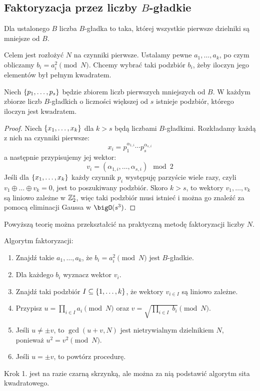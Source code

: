 \subsection{Faktoryzacja przez liczby \( B \)-gładkie}
\begin{definition}
    Dla ustalonego \( B \) liczba \( B \)-gładka to taka, której wszystkie pierwsze dzielniki są mniejsze od \( B \).
\end{definition}
    
Celem jest rozłożyć \( N \) na czynniki pierwsze. Ustalamy pewne \( a_1, \dots, a_k \), po czym obliczamy \( b_i = a_i^2 \pmod{N} \). Chcemy wybrać taki podzbiór \(b_i \), żeby iloczyn jego elementów był pełnym kwadratem.

\begin{lemma}
    Niech \( \set{p_1, \dots, p_{s}} \) będzie zbiorem liczb pierwszych mniejszych od \( B \). W każdym zbiorze liczb \( B \)-gładkich o liczności większej od \( s \) istnieje podzbiór, którego iloczyn jest kwadratem.
\end{lemma}
\begin{proof}
    Niech \( \set{x_1, \dots, x_k} \) dla \( k > s \) będą liczbami \( B \)-gładkimi. Rozkładamy każdą z nich na czynniki pierwsze:
    \[
        x_i = p_1^{\alpha_{1, i}} \cdots p_s^{\alpha_{s, i}}
    \]
    a następnie przypisujemy jej wektor:
    \[
        v_i = (\alpha_{1, i}, \dots, \alpha_{s, i}) \mod 2
    \]
    Jeśli dla \( \set{x_1, \dots, x_k} \) każdy czynnik \( p_i \) występuję parzyście wiele razy, czyli \( v_1 \oplus \ldots \oplus v_k = 0 \), jest to poszukiwany podzbiór.
    Skoro \( k > s \), to wektory \( v_1, \dots, v_k \) są liniowo zależne w \( \mathbb{Z}_2^{s} \), więc taki podzbiór musi istnieć i można go znaleźć za pomocą eliminacji Gaussa w \( \bigO(s^3) \).
\end{proof}
Powyższą teorię można przekształcić na praktyczną metodę faktoryzacji liczby \( N \).
\begin{greyframe}
    Algorytm faktoryzacji:
    \begin{enumerate}
        \item Znajdź takie \( a_1, \dots, a_k \), że \( b_i = a_i^2 \pmod{N} \) jest \( B \)-gładkie.
        \item Dla każdego \( b_i \) wyznacz wektor \( v_i \).
        \item Znajdź taki podzbiór \( I \subseteq \set{1, \dots, k} \), że wektory \( v_{i \in I} \) są liniowo zależne.
        \item Przypisz \( u = \prod_{i \in I} a_i \pmod{N} \) oraz \( v = \sqrt{\prod_{i \in I}\; b_i} \pmod{N} \).
        \item Jeśli \( u \neq \pm v \), to \( \gcd(u + v, N) \) jest nietrywialnym dzielnikiem \( N \), \\ ponieważ \( u^2 = v^2 \pmod{N} \).
        \item Jeśli \( u = \pm v \), to powtórz procedurę.
    \end{enumerate}
\end{greyframe}
Krok 1. jest na razie czarną skrzynką, ale można za nią podstawić algorytm sita kwadratowego.

